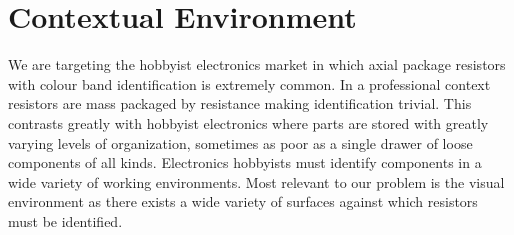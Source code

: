 \documentclass{article}
\begin{document}
\section{Contextual Environment}

We are targeting the hobbyist electronics market in which axial package resistors with colour band identification is extremely common. 
In a professional context resistors are mass packaged by resistance making identification trivial. 
This contrasts greatly with hobbyist electronics where parts are stored with greatly varying levels of organization, sometimes as poor as a single drawer of loose components of all kinds.
Electronics hobbyists must identify components in a wide variety of working environments. 
Most relevant to our problem is the visual environment as there exists a wide variety of surfaces against which resistors must be identified.
\end{document}
